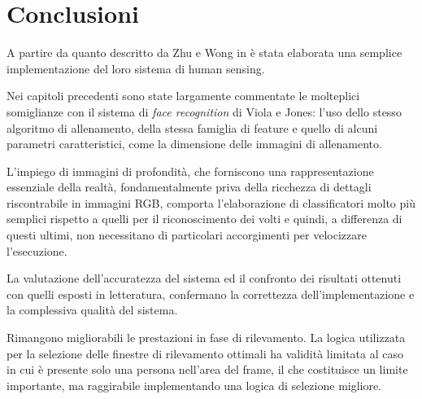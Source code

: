 
\chapter{Conclusioni} %
\label{cha:conclusioni}
	A partire da quanto descritto da Zhu e Wong in \cite{Zhu13} è stata elaborata una semplice implementazione del loro sistema di human sensing.

	Nei capitoli precedenti sono state largamente commentate le molteplici somiglianze con il sistema di \emph{face recognition} di Viola e Jones: l'uso dello stesso algoritmo di allenamento, della stessa famiglia di feature e quello di alcuni parametri caratteristici, come la dimensione delle immagini di allenamento.

	L'impiego di immagini di profondità, che forniscono una rappresentazione essenziale della realtà, fondamentalmente priva della ricchezza di dettagli riscontrabile in immagini RGB, comporta l'elaborazione di classificatori molto più semplici rispetto a quelli per il riconoscimento dei volti e quindi, a differenza di questi ultimi, non necessitano di particolari accorgimenti per velocizzare l'esecuzione.

	La valutazione dell'accuratezza del sistema ed il confronto dei risultati ottenuti con quelli esposti in letteratura, confermano la correttezza dell'implementazione e la complessiva qualità del sistema.

	Rimangono migliorabili le prestazioni in fase di rilevamento.
	La logica utilizzata per la selezione delle finestre di rilevamento ottimali ha validità limitata al caso in cui è presente solo una persona nell'area del frame, il che costituisce un limite importante, ma raggirabile implementando una logica di selezione migliore.


